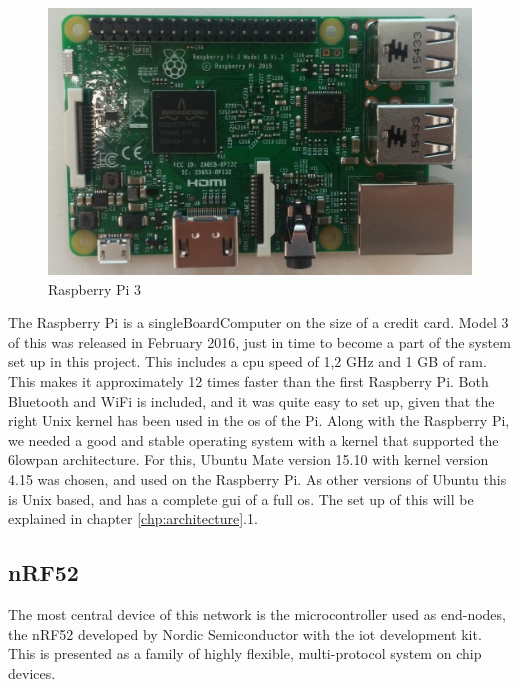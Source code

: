 \begin{figure}[ht]
    \centering
    \includegraphics[scale=0.35]{pi3.png}    
    \caption{Raspberry Pi 3}
    \label{fig:piPicture}
\end{figure}

The Raspberry Pi is a \gls{singleBoardComputer} on the size of a credit card. Model 3 of this was released in February 2016, just in time to become a part of the system set up in this project. This includes a \gls{cpu} speed of 1,2 GHz and 1 GB of \gls{ram}. This makes it approximately 12 times faster than the first Raspberry Pi. Both Bluetooth and WiFi is included, and it was quite easy to set up, given that the right Unix kernel has been used in the \gls{os} of the Pi. Along with the Raspberry Pi, we needed a good and stable operating system with a kernel that supported the \gls{6lowpan} architecture. For this, Ubuntu Mate version 15.10 with kernel version 4.15 was chosen, and used on the Raspberry Pi. As other versions of Ubuntu this is Unix based, and has a complete \gls{gui} of a full \gls{os}. The set up of this will be explained in chapter \ref{chp:architecture}.1. 

\subsection{nRF52}

The most central device of this network is the microcontroller used as end-nodes, the nRF52 developed by Nordic Semiconductor with the \gls{iot} development kit. This is presented as a family of highly flexible, multi-protocol system on chip devices. 


